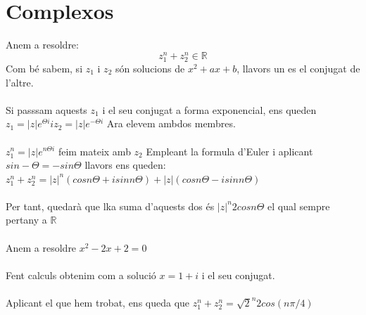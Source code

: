 \documentclass[10pt,a4paper]{article}
\begin{document}
\section{Complexos}
Anem a resoldre:
\begin{equation*}
z_1^n +z_2^n \in \mathbb{R}
\end{equation*}
Com bé sabem, si $z_1$ i $z_2$ són solucions de $ x^2 +ax +b$, llavors un es el conjugat de l'altre.\\\\
Si passsam aquests $z_1$ i el seu conjugat a forma exponencial, ens queden $z_1= |z|e^{\Theta i} i z_2=|z|e^{-\Theta i}$
Ara elevem ambdos membres.\\\\
$z_1^n=|z|e^{n\Theta i}$ feim mateix amb $z_2$
Empleant la formula d'Euler i aplicant $sin-\Theta = - sin\Theta$ llavors ens queden:\\
$z_1^n +z_2^n=|z|^n(cosn\Theta +isinn\Theta)+|z|(cosn\Theta -isinn\Theta)$\\\\
Per tant, quedarà que lka suma d'aquests dos és $|z|^n2cosn\Theta$ el qual sempre pertany a $\mathbb{R}$\\\\
Anem a resoldre $x^2-2x+2=0$\\\\
Fent calculs obtenim com a solució $x=1+i$ i el seu conjugat.\\\\ Aplicant el que hem trobat, ens queda que $z_1^n +z_2^n= \sqrt{2}^n2cos(n\pi/4)$
\end{document}
